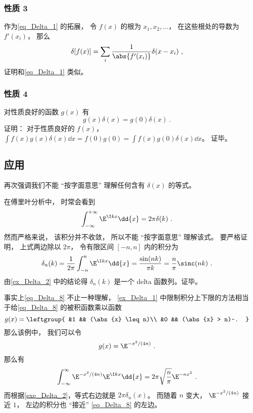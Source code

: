 \subsubsection{性质 3}
作为\autoref{eq_Delta_1} 的拓展， 令 $f(x)$ 的根为 $x_1, x_2, \dots$， 在这些根处的导数为 $f'(x_i)$， 那么
\begin{equation}\label{eq_Delta_12}
\delta[f(x)] = \sum_i \frac{1}{\abs{f'(x_i)}} \delta(x - x_i)~,
\end{equation}
证明和\autoref{eq_Delta_1} 类似。

\subsubsection{性质 4}
对性质良好的函数 $g(x)$ 有
\begin{equation}
g(x)\delta(x) = g(0)\delta(x)~.
\end{equation}
证明： 对于性质良好的 $f(x)$， $\int f(x) g(x)\delta(x) \dd{x} = f(0)g(0) = \int f(x)g(0)\delta(x) \dd{x}$。 证毕。

\subsection{应用}
再次强调我们不能 “按字面意思” 理解任何含有 $\delta(x)$ 的等式。
\begin{example}{}\label{ex_Delta_1}
在傅里叶分析中， 时常会看到
\begin{equation}\label{eq_Delta_8}
\int_{-\infty}^{+\infty} \E^{\I kx}\dd{x} = 2\pi \delta(k)~.
\end{equation}
然而严格来说， 该积分并不收敛， 所以不能 “按字面意思” 理解该式。 要严格证明， 上式两边除以 $2\pi$， 令有限区间 $[-n,n]$ 内的积分为
\begin{equation}
\delta_n(k) = \frac{1}{2\pi}\int_{-n}^{n} \E^{\I kx}\dd{x} = \frac{\sin(n k)}{\pi k} = \frac{n}{\pi} \sinc(n k)~.
\end{equation}
由\autoref{ex_Delta_2} 中的结论得 $\delta_n(k)$ 是一个 delta 函数列。证毕。
\end{example}
\begin{example}{}
事实上\autoref{eq_Delta_8} 不止一种理解， \autoref{ex_Delta_1} 中限制积分上下限的方法相当于给\autoref{eq_Delta_8} 的被积函数乘以函数
\begin{equation}
g(x) = \leftgroup{
&1 && (\abs{x} \leq n)\\
&0 && (\abs{x} > n)~.
}\end{equation}
那么该例中， 我们可以令
\begin{equation}
g(x) = \E^{-x^2/(4n)}~.
\end{equation}
那么有
\begin{equation}
\int_{-\infty}^\infty \E^{-x^2/(4n)} \E^{\I k x} \dd{x} = 2\pi \sqrt{\frac{n}{\pi}}\E^{-n x^2}~.
\end{equation}
而根据\autoref{exe_Delta_2}，等式右边就是 $2\pi\delta_n(x)$。 而随着 $n$ 变大， $\E^{-x^2/(4n)}$ 接近 $1$， 左边的积分也 “接近” \autoref{eq_Delta_8} 的左边。


\end{example}

